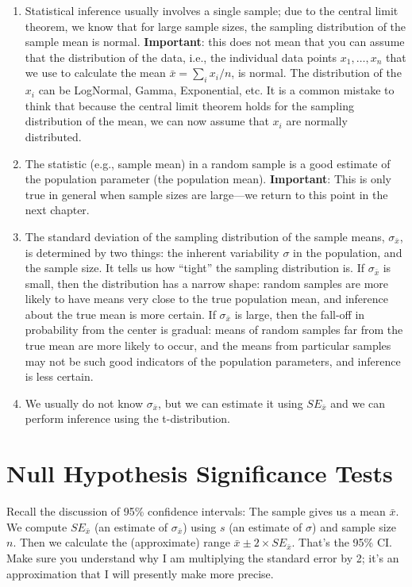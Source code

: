 \documentclass[12pt]{book}\usepackage[]{graphicx}\usepackage[]{color}
\begin{document}
\begin{enumerate}
\item
Statistical inference usually involves a single sample; due to the central limit theorem, we know that
for large sample sizes, the sampling distribution of the sample mean is normal. \textbf{Important}: this does not mean that you can assume that the distribution of the data, i.e., the individual data points $x_1,\dots, x_n$ that we use to calculate the mean $\bar{x}= \sum_i x_i/n$, is normal. The distribution of the $x_i$ can be LogNormal, Gamma, Exponential, etc. It is a common mistake to think that because the central limit theorem holds for the sampling distribution of the mean, we can now assume that $x_i$ are normally distributed.
\item
The statistic (e.g., sample mean) in a random sample is a good estimate of the population parameter (the population mean).  \textbf{Important}: This is only true in general when sample sizes are large---we return to this point in the next chapter.
\item
The standard
deviation of the sampling distribution of the sample means, $\sigma_{\bar{x}}$, is 
determined by two things: the inherent variability $\sigma$ in the population, and the sample size. 
It tells us how ``tight'' the sampling distribution is.
If $\sigma_{\bar{x}}$ is small, then the distribution has a narrow shape: random samples are more likely to have means very close to
the true population mean, 
and inference about the true mean is more certain.  If $\sigma_{\bar{x}}$ is large, then
the fall-off in probability from the center is gradual: means of random samples
far from the true mean are more likely to occur, and the means from particular samples may not be such good
indicators of the population parameters, and inference is less
certain.
\item
We usually do not know $\sigma_{\bar{x}}$, but we can estimate it using $SE_{\bar{x}}$ and we can perform inference using the t-distribution.
\end{enumerate}



\section{Null Hypothesis Significance Tests}

Recall the discussion of 95\% confidence intervals:
The sample gives us a mean $\bar{x}$.  We compute $SE_{\bar{x}}$ (an
estimate of $\sigma_{\bar{x}}$) using $s$ (an estimate of $\sigma$)
and sample size $n$.  Then we calculate the (approximate) range $\bar{x} \pm 2 \times
SE_{\bar{x}}$.  
That's the 95\% CI. 
Make sure you understand why I am multiplying the standard error by 2; it's an approximation that I will presently make more precise.
\end{document}
